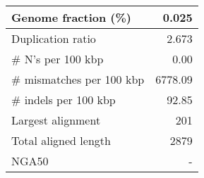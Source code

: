 \documentclass[12pt,a4paper]{article}
\begin{document}
\begin{table}[ht]
\begin{center}
\begin{tabular}{|l*{1}{|r}|}
Genome fraction (\%) & 0.025 \\ \hline
Duplication ratio & 2.673 \\ \hline
\# N's per 100 kbp & 0.00 \\ \hline
\# mismatches per 100 kbp & 6778.09 \\ \hline
\# indels per 100 kbp & 92.85 \\ \hline
Largest alignment & 201 \\ \hline
Total aligned length & 2879 \\ \hline
NGA50 & - \\ \hline
\end{tabular}
\end{center}
\end{table}
\end{document}
